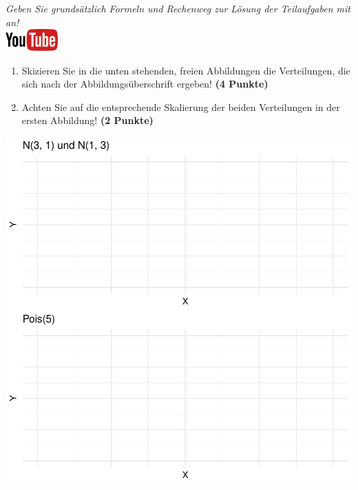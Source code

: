 \documentclass[a4paper, 10pt]{scrartcl}\usepackage[]{graphicx}\usepackage[]{xcolor}
\makeatletter
\def\maxwidth{ %
  \ifdim\Gin@nat@width>\linewidth
    \linewidth
  \else
    \Gin@nat@width
  \fi
}
\makeatother
\begin{document}
\textit{Geben Sie grunds{\"a}tzlich Formeln und Rechenweg zur L{\"o}sung der
  Teilaufgaben mit an!} \\[1Ex]

\hfill\href{https://youtu.be/MiD42k4l5Ag}{\includegraphics[width =
  2cm]{img/youtube}}\\[1Ex]



\begin{enumerate}
\item Skizieren Sie in die unten stehenden, freien Abbildungen die
  Verteilungen, die sich nach der Abbildungs{\"u}berschrift ergeben! \textbf{(4
    Punkte)}
\item Achten Sie auf die entsprechende Skalierung der beiden Verteilungen
  in der ersten Abbildung! \textbf{(2 Punkte)}
\end{enumerate}



{\centering \includegraphics[width=\maxwidth]{img/histogram-01-1} 

}
\end{document}
